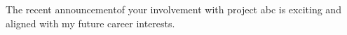 The recent announcementof your involvement with project abc is exciting and aligned with my future career interests.
